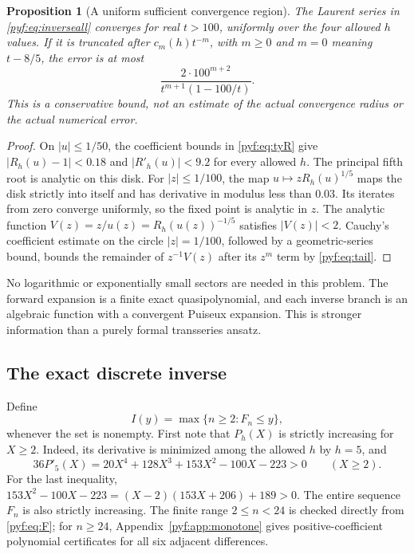 \documentclass[11pt,a4paper]{article}
\numberwithin{equation}{section}
\newtheorem{proposition}[theorem]{Proposition}
\theoremstyle{definition}
\begin{document}
\begin{proposition}[A uniform sufficient convergence region]\label{pyf:prop:radius}
The Laurent series in \eqref{pyf:eq:inverseall} converges for real $t>100$,
uniformly over the four allowed $h$ values. If it is truncated after
$c_m(h)t^{-m}$, with $m\geq0$ and $m=0$ meaning $t-8/5$, the error is at
most
\begin{equation}\label{pyf:eq:tail}
\frac{2\cdot100^{m+2}}{t^{m+1}(1-100/t)}.
\end{equation}
This is a conservative bound, not an estimate of the actual convergence
radius or the actual numerical error.
\end{proposition}

\begin{proof}
On $|u|\leq1/50$, the coefficient bounds in \eqref{pyf:eq:tyR} give
$|R_h(u)-1|<0.18$ and $|R'_h(u)|<9.2$ for every allowed $h$.
The principal fifth root is analytic on this disk. For $|z|\leq1/100$,
the map $u\mapsto zR_h(u)^{1/5}$ maps the disk strictly into itself and
has derivative in modulus less than $0.03$. Its iterates from zero
converge uniformly, so the fixed point is analytic in $z$.
The analytic function $V(z)=z/u(z)=R_h(u(z))^{-1/5}$ satisfies $|V(z)|<2$.
Cauchy's coefficient estimate on the circle $|z|=1/100$, followed by a
geometric-series bound, bounds the remainder of $z^{-1}V(z)$ after its
$z^m$ term by \eqref{pyf:eq:tail}.
\end{proof}

No logarithmic or exponentially small sectors are needed in this problem.
The forward expansion is a finite exact quasipolynomial, and each inverse
branch is an algebraic function with a convergent Puiseux expansion. This
is stronger information than a purely formal transseries ansatz.

\subsection{The exact discrete inverse}

Define
\[
I(y)=\max\{n\geq2:F_n\leq y\},
\]
whenever the set is nonempty. First note that $P_h(X)$ is strictly increasing
for $X\geq2$. Indeed, its derivative is minimized among the allowed $h$
by $h=5$, and
\[
36P'_5(X)=20X^4+128X^3+153X^2-100X-223>0\qquad(X\geq2).
\]
For the last inequality,
$153X^2-100X-223=(X-2)(153X+206)+189>0$.
The entire sequence $F_n$ is also strictly increasing. The finite range
$2\leq n<24$ is checked directly from \eqref{pyf:eq:F}; for $n\geq24$,
Appendix~\ref{pyf:app:monotone} gives positive-coefficient polynomial
certificates for all six adjacent differences.
\end{document}
